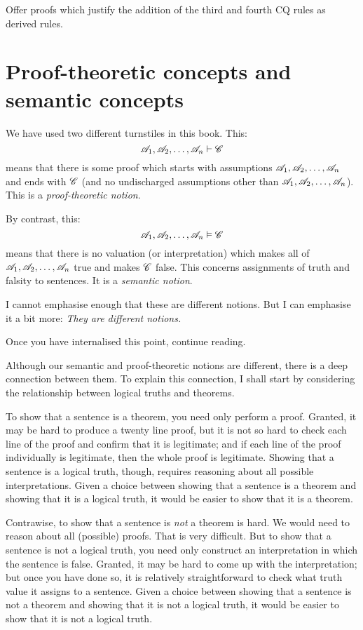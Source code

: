\practiceproblems

\problempart
Offer proofs which justify the addition of the third and fourth CQ rules as derived rules.



\chapter{Proof-theoretic concepts and semantic concepts}
We have used two different turnstiles in this book.  This:
$$\mathscr{A}_1, \mathscr{A}_2, \ldots, \mathscr{A}_n \vdash \mathscr{C}$$
means that there is some proof which starts with assumptions $\mathscr{A}_1, \mathscr{A}_2, \ldots, \mathscr{A}_n$ and ends with $\mathscr{C}$ (and no undischarged assumptions other than $\mathscr{A}_1, \mathscr{A}_2, \ldots, \mathscr{A}_n$). This is a \emph{proof-theoretic notion}.

By contrast, this:
$$\mathscr{A}_1, \mathscr{A}_2, \ldots, \mathscr{A}_n \vDash \mathscr{C}$$
means that there is no valuation (or interpretation) which makes all of $\mathscr{A}_1, \mathscr{A}_2, \ldots, \mathscr{A}_n$ true and makes $\mathscr{C}$ false. This concerns assignments of truth and falsity to sentences. It is a \emph{semantic notion}.

I cannot emphasise enough that these are different notions. But I can emphasise it a bit more: \emph{They are different notions.}

Once you have internalised this point, continue reading. 

Although our semantic and proof-theoretic notions are different, there is a deep connection between them. To explain this connection, I shall start by considering the relationship between logical truths and theorems.

To show that a sentence is a theorem, you need only perform a proof. Granted, it may be hard to produce a twenty line proof, but it is not so hard to check each line of the proof and confirm that it is legitimate; and if each line of the proof individually is legitimate, then the whole proof is legitimate. Showing that a sentence is a logical truth, though, requires reasoning about all possible interpretations. Given a choice between showing that a sentence is a theorem and showing that it is a logical truth, it would be easier to show that it is a theorem.

Contrawise, to show that a sentence is \emph{not} a theorem is hard. We would need to reason about all (possible) proofs. That is very difficult. But to show that a sentence is not a logical truth, you need only construct an interpretation in which the sentence is false. Granted, it may be hard to come up with the interpretation; but once you have done so, it is relatively straightforward to check what truth value it assigns to a sentence. Given a choice between showing that a sentence is not a theorem and showing that it is not a logical truth, it would be easier to show that it is not a logical truth.

